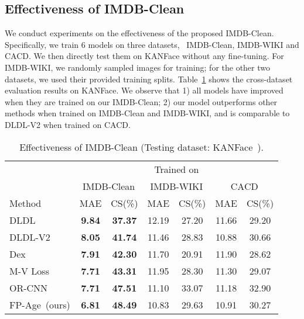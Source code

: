 \subsection{Effectiveness of IMDB-Clean}
We conduct experiments on the effectiveness of the proposed IMDB-Clean. Specifically, we train 6 models on three datasets, \ie~IMDB-Clean, IMDB-WIKI and CACD. We then directly test them on KANFace without any fine-tuning. For IMDB-WIKI, we randomly sampled  images for training; for the other two datasets, we used their provided training splits.
Table~\ref{tab:imdb-clean-effectiveness} shows the cross-dataset evaluation results on KANFace. We observe that 1) all models have improved when they are trained on our IMDB-Clean; 2) our model outperforms other methods when trained on IMDB-Clean and IMDB-WIKI, and is comparable to DLDL-V2 when trained on CACD. 
\begin{table}[ht]
	\caption{Effectiveness of IMDB-Clean (Testing dataset: KANFace~\cite{georgopoulosInvestigatingBiasDeep2020}). }\label{tab:imdb-clean-effectiveness}
	\begin{center}
	\begin{threeparttable}
	\begin{adjustbox}{width=\columnwidth}
		\begin{tabular}{l|c|c|c|c|c|c}
    		\toprule
			 \multirow{2}{*}{}& \multicolumn{6}{c}{Trained on}  \\ 
			& \multicolumn{2}{c|}{IMDB-Clean} & \multicolumn{2}{c|}{IMDB-WIKI} & \multicolumn{2}{c}{CACD}
			\\ 
			\midrule \hline
            Method & MAE & CS(\%) & MAE & CS(\%) & MAE & CS(\%) 
            \\ 
            \hline 
			DLDL\cite{gaoDeepLabelDistribution2017}  & \textbf{9.84} &\textbf{37.37}   & 12.19 & 27.20 &11.66 &29.20  \\
			DLDL-V2\cite{gaoAgeEstimationUsing2018}   &\textbf{8.05} & \textbf{41.74} & 11.46 & 28.83 &10.88 & 30.66   \\
			Dex\cite{rotheDeepExpectationReal2018}   & \textbf{7.91} & \textbf{42.30} & 11.70 & 20.91 & 11.90 & 28.62   \\
			M-V Loss\cite{panMeanVarianceLossDeep2018}   & \textbf{7.71} & \textbf{43.31}& 11.95 & 28.30  & 11.30&   29.07 \\
			OR-CNN\cite{niuOrdinalRegressionMultiple2016}   & \textbf{7.71} & \textbf{47.51} & 11.10 & 33.07 & 11.18  & 32.90 \\
			\hline
			FP-Age~(ours)   & \textbf{6.81} & \textbf{48.49} & 10.83 & 29.63 & 10.91 &  30.27  \\
			\bottomrule
		\end{tabular}
		\end{adjustbox}
	\end{threeparttable}
	\end{center}
\end{table}

